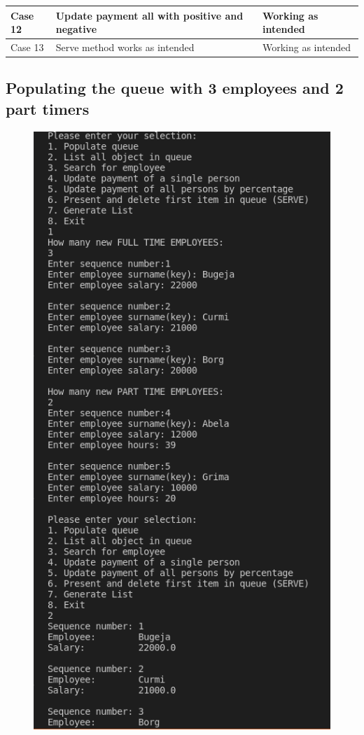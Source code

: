 \documentclass[12pt]{article}
\begin{document}
\newpage
\begin{tabularx}{1\textwidth} { 
  | >{\raggedright\arraybackslash}X 
  | >{\centering\arraybackslash}X 
  | >{\raggedleft\arraybackslash}X | }
  
 \hline
 Case 12  & Update payment all with positive and negative & Working as intended \\
\hline
 Case 13  & Serve method works as intended  & Working as intended \\
\hline
\end{tabularx}
\newpage
\subsection{Populating the queue with 3 employees and 2 part timers}
\begin{figure}[h]
\centering
\includegraphics[scale=0.30]{Images/Testing 1/1.png}
\end{figure}
\end{document}
